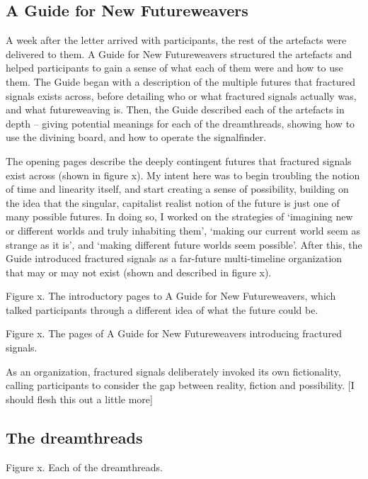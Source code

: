 
\subsection{A Guide for New Futureweavers}

A week after the letter arrived with participants, the rest of the artefacts were delivered to them. A Guide for New Futureweavers structured the artefacts and helped participants to gain a sense of what each of them were and how to use them. The Guide began with a description of the multiple futures that fractured signals exists across, before detailing who or what fractured signals actually was, and what futureweaving is. Then, the Guide described each of the artefacts in depth – giving potential meanings for each of the dreamthreads, showing how to use the divining board, and how to operate the signalfinder. 

The opening pages describe the deeply contingent futures that fractured signals exist across (shown in figure x).  My intent here was to begin troubling the notion of time and linearity itself, and start creating a sense of possibility, building on the idea that the singular, capitalist realist notion of the future is just one of many possible futures. In doing so, I worked on the strategies of ‘imagining new or different worlds and truly inhabiting them’, ‘making our current world seem as strange as it is’, and ‘making different future worlds seem possible’.  After this, the Guide introduced fractured signals as a far-future multi-timeline organization that may or may not exist (shown and described in figure x).

Figure x.  The introductory pages to A Guide for New Futureweavers, which talked participants through a different idea of what the future could be. 

Figure x. The pages of A Guide for New Futureweavers introducing fractured signals.

As an organization, fractured signals deliberately invoked its own fictionality, calling participants to consider the gap between reality, fiction and possibility.  [I should flesh this out a little more]

\subsection{The dreamthreads}

Figure x. Each of the dreamthreads. 

